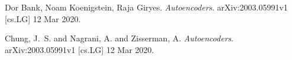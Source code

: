 \begin{thebibliography}{1}
Dor Bank, Noam Koenigstein, Raja Giryes. 
\textit{Autoencoders}. 
arXiv:2003.05991v1 [cs.LG] 12 Mar 2020.

Chung, J.~S. and Nagrani, A. and Zisserman, A.
\textit{Autoencoders}. 
arXiv:2003.05991v1 [cs.LG] 12 Mar 2020.

\end{thebibliography}